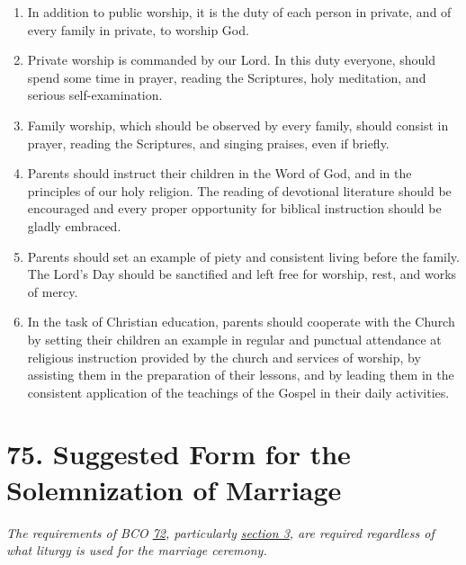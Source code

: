 \documentclass[
]{book}
\providecommand{\tightlist}{%
  \setlength{\itemsep}{0pt}\setlength{\parskip}{0pt}}
\begin{document}
\begin{enumerate}
\def\labelenumi{\arabic{enumi}.}
\tightlist
\item
  \protect\hypertarget{74}{\href{}{}}In addition to public worship, it is the duty of each person in private, and of every family in private, to worship God.
\item
  Private worship is commanded by our Lord. In this duty everyone, should spend some time in prayer, reading the Scriptures, holy meditation, and serious self-examination.
\item
  Family worship, which should be observed by every family, should consist in prayer, reading the Scriptures, and singing praises, even if briefly.
\item
  Parents should instruct their children in the Word of God, and in the principles of our holy religion. The reading of devotional literature should be encouraged and every proper opportunity for biblical instruction should be gladly embraced.
\item
  Parents should set an example of piety and consistent living before the family. The Lord's Day should be sanctified and left free for worship, rest, and works of mercy.
\item
  In the task of Christian education, parents should cooperate with the Church by setting their children an example in regular and punctual attendance at religious instruction provided by the church and services of worship, by assisting them in the preparation of their lessons, and by leading them in the consistent application of the teachings of the Gospel in their daily activities.
\end{enumerate}

\hypertarget{suggested-form-for-the-solemnization-of-marriage}{%
\section*{75. Suggested Form for the Solemnization of Marriage}\label{suggested-form-for-the-solemnization-of-marriage}}

\protect\hypertarget{chapter-slug-75-suggested-form-for-the-solemnization-of-marriage}{\href{}{}}

\protect\hypertarget{75}{\href{}{}}\emph{The requirements of BCO \protect\hyperlink{72}{72}, particularly \protect\hyperlink{72.3}{section 3}, are required regardless of what liturgy is used for the marriage ceremony.}
\end{document}
